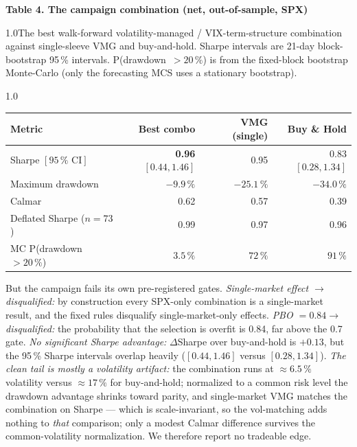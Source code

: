 \documentclass[12pt,a4paper]{article}
\newcommand{\tnote}[1]{\par\vspace{1.2ex}\begin{spacing}{1.0}\small\noindent #1\par\end{spacing}\vspace{1.2ex}}
\begin{document}
\begin{table}[t]\centering
\textbf{Table 4. The campaign combination (net, out-of-sample, SPX)}
\tnote{The best walk-forward volatility-managed / VIX-term-structure combination against single-sleeve
VMG and buy-and-hold. Sharpe intervals are 21-day block-bootstrap 95\,\% intervals. P(drawdown~$>20\,\%$)
is from the fixed-block bootstrap Monte-Carlo (only the forecasting MCS uses a stationary bootstrap).}
\begin{spacing}{1.0}
\begin{tabular}{lrrr}
\toprule
Metric & Best combo & VMG (single) & Buy \& Hold \\
\midrule
Sharpe $[95\,\%\text{ CI}]$      & \textbf{0.96} $[0.44,1.46]$ & 0.95 & 0.83 $[0.28,1.34]$ \\
Maximum drawdown                 & $\mathbf{-9.9\,\%}$ & $-25.1\,\%$ & $-34.0\,\%$ \\
Calmar                           & 0.62 & 0.57 & 0.39 \\
Deflated Sharpe ($n=73$)         & 0.99 & 0.97 & 0.96 \\
MC P(drawdown $>20\,\%$)         & $3.5\,\%$ & $72\,\%$ & $91\,\%$ \\
\bottomrule
\end{tabular}
\end{spacing}
\label{tab:campaign}
\end{table}

But the campaign fails its own pre-registered gates. \emph{Single-market effect $\to$ disqualified:}
by construction every SPX-only combination is a single-market result, and the fixed rules disqualify
single-market-only effects. \emph{PBO $=0.84\to$ disqualified:} the probability that the selection is
overfit is 0.84, far above the 0.7 gate. \emph{No significant Sharpe advantage:} $\Delta$Sharpe over
buy-and-hold is $+0.13$, but the 95\,\% Sharpe intervals overlap heavily ($[0.44,1.46]$ versus
$[0.28,1.34]$). \emph{The clean tail is mostly a volatility artifact:} the combination runs at
$\approx6.5\,\%$ volatility versus $\approx17\,\%$ for buy-and-hold; normalized to a common risk level
the drawdown advantage shrinks toward parity, and single-market VMG matches the combination on
Sharpe --- which is scale-invariant, so the vol-matching adds nothing to \emph{that} comparison;
only a modest Calmar difference survives the common-volatility normalization. We therefore report
no tradeable edge.
\end{document}
